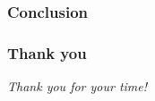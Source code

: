 \documentclass[9pt]{beamer}
\newenvironment{myframe}[1][]{%
\begin{frame}%
\frametitle{#1}
\setcounter{footnote}{0}


}{%
\end{frame}%
}
\begin{document}
\begin{myframe}[Conclusion]
\end{myframe}

\begin{myframe}[Thank you]
    \centering \Large
    \emph{Thank you for your time!}
\end{myframe}
\end{document}
